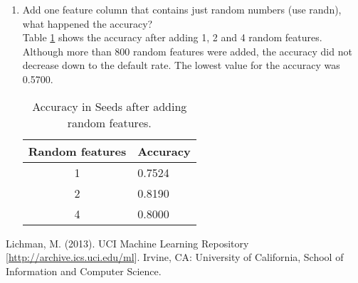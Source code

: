 \documentclass[10pt]{scrartcl}
\begin{document}
\begin{enumerate}
 \item Add one feature column that contains just random numbers (use randn), what happened the accuracy? \\
 Table \ref{tab:acc4} shows the accuracy after adding 1, 2 and 4 random features.  Although more than 800 random features were added, the accuracy did not decrease down to the default rate.  The lowest value for the accuracy was 0.5700.
 \begin{table}[h!]
 \centering
 \begin{tabular}{cl}
  \toprule
  \textbf{Random features} & \textbf{Accuracy} \\
  \midrule
  1 & 0.7524 \\ 
  2 & 0.8190 \\
  4 & 0.8000 \\
  \bottomrule
 \end{tabular}
 \caption{Accuracy in Seeds after adding random features.}\label{tab:acc4}
 \end{table}
\end{enumerate}

\begin{thebibliography}{9}

Lichman, M. (2013). UCI Machine Learning Repository [\url{http://archive.ics.uci.edu/ml}]. Irvine, CA: University of California, School of Information and Computer Science.

\end{thebibliography}
\end{document}
